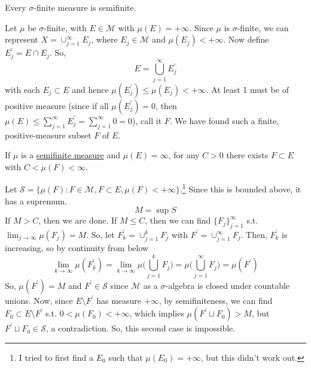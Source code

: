	\begin{exercise}[Folland 1.13]
		Every $\sigma$-finite measure is semifinite.
	\end{exercise}
	\begin{solution}
		Let $\mu$ be $\sigma$-finite, with $E \in \mathcal{M}$ with $\mu(E) = +\infty$. Since $\mu$ is $\sigma$-finite, we can represent $X = \cup_{j=1}^\infty E_j$, where $E_j \in \mathcal{M}$ and $\mu(E_j) < +\infty$. Now define $E_j^\prime = E \cap E_j$. So, 
		\begin{equation}
			E = \bigcup_{j=1}^\infty E_j^\prime
		\end{equation}
		with each $E_j \subset E$ and hence $\mu(E_j^\prime) \leq \mu(E_j) < +\infty$. At least 1 must be of positive measure (since if all $\mu(E_j^\prime) = 0$, then $\mu(E) \leq \sum_{j=1}^\infty E_j^\prime = \sum_{j=1}^\infty 0 = 0$), call it $F$. We have found such a finite, positive-measure subset $F$ of $E$. 
	\end{solution}

	\begin{exercise}[Folland 1.14]
		If $\mu$ is a \hyperref[def:semifinite-measure]{semifinite measure} and $\mu(E) = \infty$, for any $C > 0$ there exists $F \subset E$ with $C < \mu(F) < \infty$.
	\end{exercise}
	\begin{solution}
		Let $\mathcal{S} = \{\mu(F) \colon F \in \mathcal{M}, F \subset E, \mu(F) < +\infty\}$.\footnote{I tried to first find a $E_0$ such that $\mu(E_0) = +\infty$, but this didn't work out.} Since this is bounded above, it has a supremum. 
		\begin{equation}
			M = \sup{S}
		\end{equation}
		If $M > C$, then we are done. If $M \leq C$, then we can find $\{F_j\}_{j=1}^\infty$ s.t. $\lim_{j \to \infty} \mu(F_j) = M$. So, let $F_k^\prime = \cup_{j=1}^k F_j$ with $F^\prime = \cup_{j=1}^\infty F_j$. Then, $F_k^\prime$ is increasing, so by continuity from below
		\begin{equation}
			\lim_{k \to \infty} \mu(F_k^\prime) = \lim_{k \to \infty} \mu \bigg( \bigcup_{j=1}^k F_j \bigg) = \mu \bigg( \bigcup_{j=1}^\infty F_j \bigg) = \mu(F^\prime)
		\end{equation}
		So, $\mu(F^\prime) = M$ and $F^\prime \in \mathcal{S}$ since $\mathcal{M}$ as a $\sigma$-algebra is closed under countable unions. Now, since $E \setminus F^\prime$ has measure $+\infty$, by semifiniteness, we can find $F_0 \subset E \setminus F^\prime$ s.t. $0 < \mu(F_0) < +\infty$, which implies $\mu(F^\prime \sqcup F_0) > M$, but $F^\prime \sqcup F_0 \in \mathcal{S}$, a contradiction. So, this second case is impossible. 
	\end{solution}

